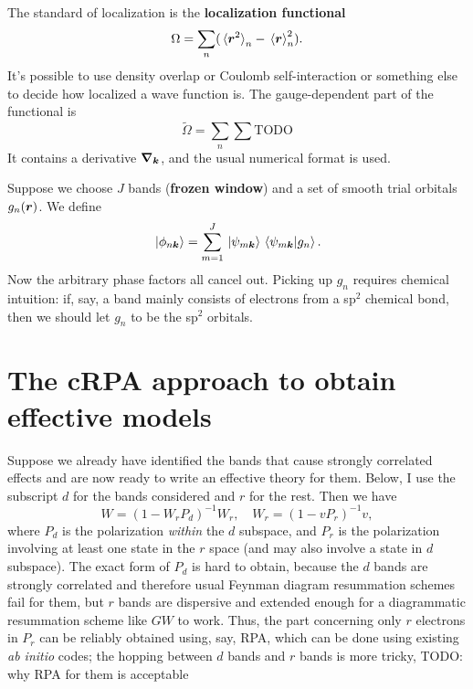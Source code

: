 \documentclass[hyperref, a4paper, 12pt]{report}
\newcommand*{\concept}[1]{{\textbf{#1}}}
\newcommand*{\abinitio}{\textit{ab initio}}
\begin{document}
The standard of localization is the \concept{localization functional}
\begin{equation}
    \Omega = \sum_n (\expval*{\vb*{r}^2}_n - \expval*{\vb*{r}}_n^2).
\end{equation}
It's possible to use density overlap or Coulomb self-interaction 
or something else 
to decide how localized a wave function is. 
The gauge-dependent part of the functional 
is 
\begin{equation}
    \tilde{\Omega} = \sum_n \sum_{} \text{TODO}
\end{equation}
It contains a derivative $\grad_{\vb*{k}}$,
and the usual numerical format is used. 


Suppose we choose $J$ bands (\concept{frozen window}) and a set of smooth trial orbitals $g_n(\vb*{r})$.
We define 
\begin{equation}
    \ket*{\phi_{n \vb*{k}}} = \sum_{m = 1}^J \ket*{\psi_{m \vb*{k}}} \braket*{\psi_{m \vb*{k}}}{g_n}.
\end{equation}
Now the arbitrary phase factors all cancel out. 
Picking up $g_n$ requires chemical intuition: 
if, say, a band mainly consists of electrons from a sp$^2$ chemical bond, 
then we should let $g_n$ to be the sp$^2$ orbitals. 

\section{The cRPA approach to obtain effective models}

Suppose we already have identified the bands that cause strongly correlated effects
and are now ready to write an effective theory for them.
Below, I use the subscript $d$ for the bands considered and $r$ for the rest.
Then we have\cite{aryasetiawan20117} 
\begin{equation}
    W = (1 - W_r P_d)^{-1} W_r, \quad 
    W_r = (1 - v P_r)^{-1}v,
\end{equation}
where $P_d$ is the polarization \emph{within} the $d$ subspace,
and $P_r$ is the polarization involving at least one state in the $r$ space 
(and may also involve a state in $d$ subspace).
The exact form of $P_d$ is hard to obtain,
because the $d$ bands are strongly correlated and therefore 
usual Feynman diagram resummation schemes fail for them,
but $r$ bands are dispersive and extended enough 
for a diagrammatic resummation scheme like $GW$ to work.
Thus, the part concerning only $r$ electrons in $P_r$ can be reliably 
obtained using, say, RPA, 
which can be done using existing \abinitio{} codes;
the hopping between $d$ bands and $r$ bands is more tricky,
TODO: why RPA for them is acceptable
\end{document}
